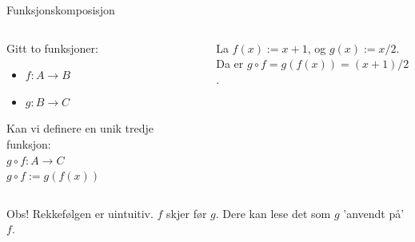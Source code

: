 \begin{frame}{Funksjonskomposisjon}
    \begin{columns}
    \begin{column}{0.38\textwidth}
Gitt to funksjoner:
    \begin{itemize}
        \item $f : A \rightarrow B$
        \item $g : B \rightarrow C$
    \end{itemize}
Kan vi definere en unik tredje funksjon: \\
    $g \circ f : A \rightarrow C$\\
    $g \circ f := g(f(x))$\\
    \pause
    \end{column}
    \begin{column}{0.55\textwidth}
        \centering
        La $f(x) := x+1$, og $g(x) := x/2$.\\
        Da er $g \circ f = g(f(x)) = (x+1)/2$.\\
        \begin{figure}
            \centering
            \qquad
            \label{fig:g o f}
        \end{figure}
    \end{column}
    \end{columns}
    \pause
    Obs! Rekkefølgen er uintuitiv. $f$ skjer før $g$. Dere kan lese det som $g$ 'anvendt på' $f$.
\end{frame}

